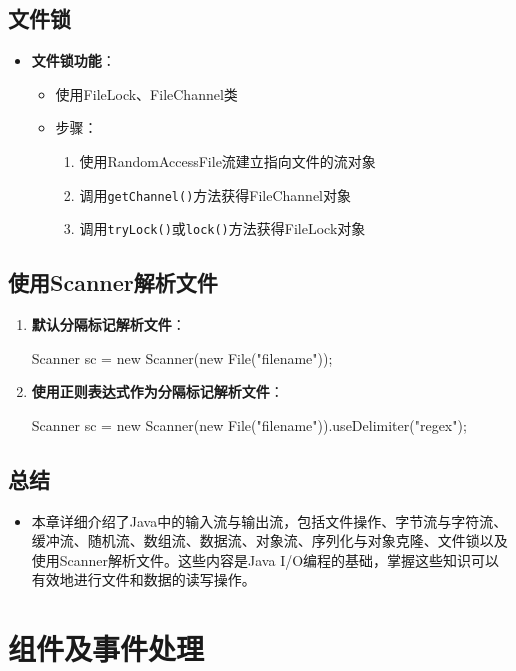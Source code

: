 \documentclass[a4paper, 10pt]{ctexart}
\begin{document}
\subsection{文件锁}
\begin{itemize}
  \item \textbf{文件锁功能}：
  \begin{itemize}
    \item 使用FileLock、FileChannel类
    \item 步骤：
    \begin{enumerate}
      \item 使用RandomAccessFile流建立指向文件的流对象
      \item 调用\texttt{getChannel()}方法获得FileChannel对象
      \item 调用\texttt{tryLock()}或\texttt{lock()}方法获得FileLock对象
    \end{enumerate}
  \end{itemize}
\end{itemize}

\subsection{使用Scanner解析文件}
\begin{enumerate}
  \item \textbf{默认分隔标记解析文件}：
  \begin{codeblock}
Scanner sc = new Scanner(new File("filename"));
  \end{codeblock}
  \item \textbf{使用正则表达式作为分隔标记解析文件}：
  \begin{codeblock}
Scanner sc = new Scanner(new File("filename")).useDelimiter("regex");
  \end{codeblock}
\end{enumerate}

\subsection{总结}
\begin{itemize}
  \item 本章详细介绍了Java中的输入流与输出流，包括文件操作、字节流与字符流、缓冲流、随机流、数组流、数据流、对象流、序列化与对象克隆、文件锁以及使用Scanner解析文件。这些内容是Java I/O编程的基础，掌握这些知识可以有效地进行文件和数据的读写操作。
\end{itemize}

\section{组件及事件处理}
\end{document}
